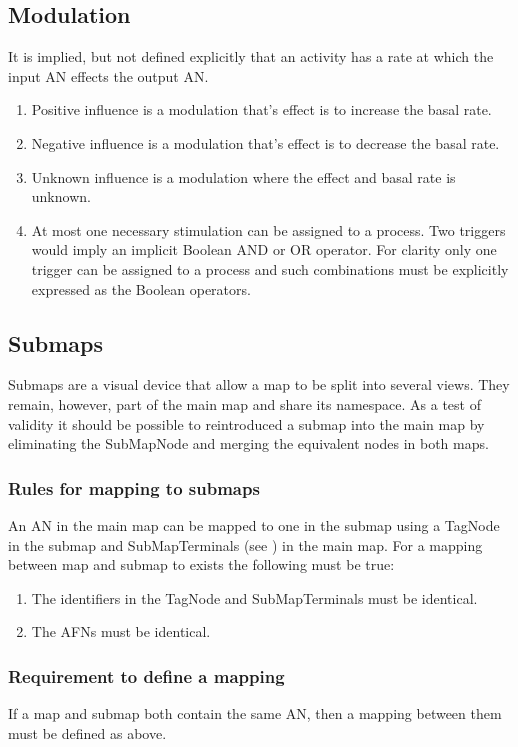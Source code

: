 \subsection{Modulation}

It is implied, but not defined explicitly that an activity has a rate at which the input AN effects the output AN. 

\begin{enumerate}
\item Positive influence is a modulation that's effect is to increase the basal rate.
\item Negative influence is a modulation that's effect is to decrease the basal rate.
\item Unknown influence is a modulation where the effect and basal rate is unknown.
\item At most one necessary stimulation can be assigned to a process. Two triggers
  would imply an implicit Boolean AND or OR operator. For clarity only
  one trigger can be assigned to a process and such combinations must be
  explicitly expressed as the Boolean operators.
\end{enumerate}

\subsection{Submaps}

Submaps are a visual device that allow a map to be split into several views. They remain, however, part of the main map and share its
namespace. As a test of validity it should be possible to reintroduced a submap into the main map by eliminating the SubMapNode and merging
the equivalent nodes in both maps.

\subsubsection{Rules for mapping to submaps}

An AN in the main map can be mapped to one in the submap using a TagNode in the submap and SubMapTerminals (see ) in the main map. For a
mapping between map and submap to exists the following must be true:

\begin{enumerate}
\item The identifiers in the TagNode and SubMapTerminals must be identical.
\item The AFNs must be identical.
\end{enumerate}

\subsubsection{Requirement to define a mapping}

If a map and submap both contain the same AN, then a mapping between them must be defined as above.